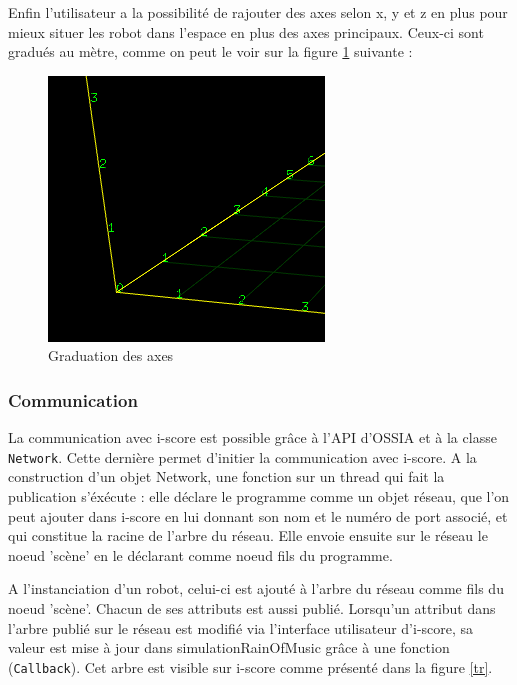 Enfin l'utilisateur a la possibilité de rajouter des axes selon x, y et z en plus pour mieux situer les robot dans l'espace en plus des axes principaux. Ceux-ci sont gradués au mètre, comme on peut le voir sur la figure \ref{grad} suivante :
					
\begin{figure}[H]
\centering
\includegraphics[scale=0.8]{imgs/graduation}
\caption{Graduation des axes}
\label{grad}
\end{figure}

\subsubsection{Communication}

La communication avec i-score est possible grâce à l'API d'OSSIA et à la classe \verb|Network|. Cette dernière permet d'initier la communication avec i-score. A la construction d'un objet Network, une fonction sur un thread qui fait la publication s'éxécute : elle déclare le programme comme un objet réseau, que l'on peut ajouter dans i-score en lui donnant son nom et le numéro de port associé, et qui constitue la racine de l'arbre du réseau. Elle envoie ensuite sur le réseau le noeud 'scène' en le déclarant comme noeud fils du programme.

A l'instanciation d'un robot, celui-ci est ajouté à l'arbre du réseau comme fils du noeud 'scène'. Chacun de ses attributs est aussi publié. Lorsqu'un attribut dans l'arbre publié sur le réseau est modifié via l'interface utilisateur d'i-score, sa valeur est mise à jour dans simulationRainOfMusic grâce à une fonction (\verb|Callback|). Cet arbre est visible sur i-score comme présenté dans la figure \ref{tr}.

